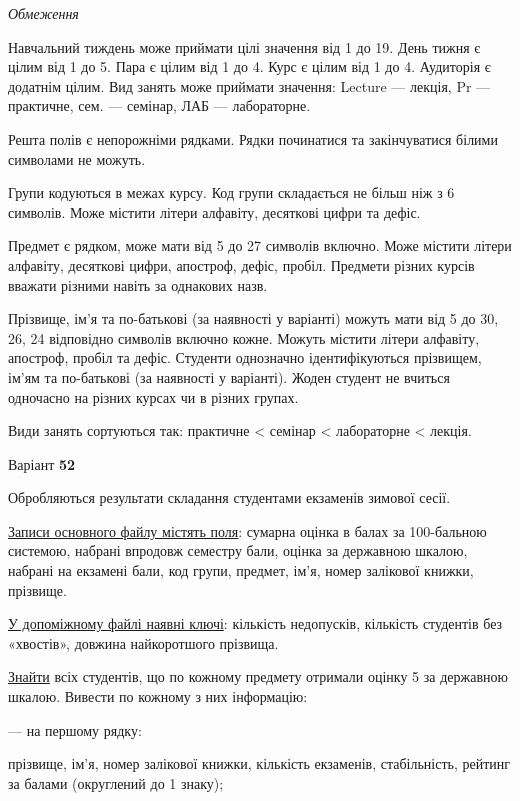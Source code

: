 \documentclass[11pt, ukrainian]{article}
\begin{document}

\bigskip\textit{Обмеження}

Навчальний тиждень може приймати цілі значення від 1 до 19.
День тижня є цілим від 1 до 5. Пара є цілим від 1 до 4.
Курс є цілим від 1 до 4. Аудиторія є додатнім цілим.
Вид занять може приймати значення:
Lecture --- лекція, Pr --- практичне, сем. --- семінар, ЛАБ --- лабораторне.

Решта полів є непорожніми рядками.
Рядки починатися та закінчуватися білими символами не можуть.

Групи кодуються в межах курсу.
Код групи складається не більш ніж з 6 символів.
Може містити літери алфавіту, десяткові цифри та дефіс.

Предмет є рядком, може мати від 5 до 27 символів включно.
Може містити літери алфавіту, десяткові цифри, апостроф, дефіс, пробіл.
Предмети різних курсів вважати різними навіть за однакових назв.

Прізвище, ім’я та по-батькові (за наявності у варіанті)
можуть мати від 5 до 30, 26, 24 відповідно символів включно кожне.
Можуть містити літери алфавіту, апостроф, пробіл та дефіс.
Студенти однозначно ідентифікуються прізвищем, ім’ям та по-батькові (за наявності у варіанті).
Жоден студент не вчиться одночасно на різних курсах чи в різних групах.

Види занять сортуються так: практичне < семінар < лабораторне < лекція.





\par
\newpage
{\center Варіант  \No \textbf { 52 }\par}
\bigskip
Обробляються результати складання студентами екзаменів зимової сесії.

\underline{Записи основного файлу містять поля}: сумарна оцінка в балах за 100-бальною системою, набрані впродовж семестру бали, оцінка за державною шкалою, набрані на екзамені бали, код групи, предмет, ім’я, номер залікової книжки, прізвище.

\underline{У допоміжному файлі наявні ключі}: кількість недопусків, кількість студентів без «хвостів», довжина найкоротшого прізвища.

\underline{Знайти} всіх студентів, що по кожному предмету отримали оцінку 5 за державною шкалою. Вивести по кожному з них інформацію:\par
{\noindent}--- на першому рядку:\par
прізвище, ім’я, номер залікової книжки, кількість екзаменів, стабільність, рейтинг за балами (округлений до 1 знаку);
\end{document}
